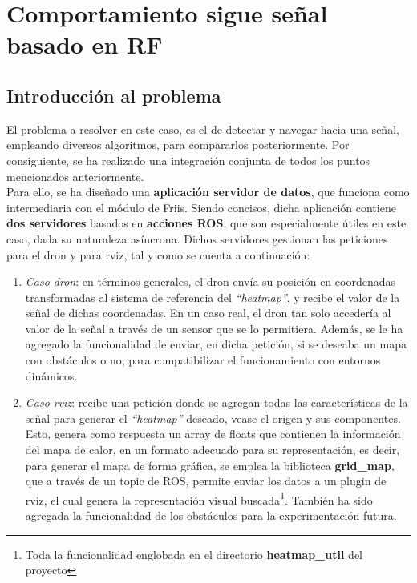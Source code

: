 
\newpage
\section{Comportamiento sigue señal basado en \ac{RF}}
\label{sec:signal_follow}

\subsection{Introducción al problema}
\label{subsec:intro_sf}

El problema a resolver en este caso, es el de detectar y navegar hacia una señal, empleando diversos algoritmos, para compararlos posteriormente. Por consiguiente, se ha realizado una integración conjunta de todos los puntos mencionados anteriormente.\\

Para ello, se ha diseñado una \textbf{aplicación servidor de datos}, que funciona como intermediaria con el módulo de Friis. Siendo concisos, dicha aplicación contiene \textbf{dos servidores} basados en \textbf{acciones \ac{ROS}}, que son especialmente útiles en este caso, dada su naturaleza asíncrona. Dichos servidores gestionan las peticiones para el dron y para rviz, tal y como se cuenta a continuación:

\begin{enumerate}
	\item \emph{Caso dron}: en términos generales, el dron envía su posición en coordenadas transformadas al sistema de referencia del \emph{``heatmap''}, y recibe el valor de la señal de dichas coordenadas. En un caso real, el dron tan solo accedería al valor de la señal a través de un sensor que se lo permitiera. Además, se le ha agregado la funcionalidad de enviar, en dicha petición, si se deseaba un mapa con obstáculos o no, para compatibilizar el funcionamiento con entornos dinámicos.

	\item \emph{Caso rviz}: recibe una petición donde se agregan todas las características de la señal para generar el \emph{``heatmap''} deseado, vease el origen y sus componentes. Esto, genera como respuesta un array de floats que contienen la información del mapa de calor, en un formato adecuado para su representación, es decir, para generar el mapa de forma gráfica, se emplea la biblioteca \textbf{grid\_map}, que a través de un topic de \ac{ROS}, permite enviar los datos a un plugin de rviz, el cual genera la representación visual buscada\footnote[2]{Toda la funcionalidad englobada en el directorio \textbf{heatmap\_util} del proyecto}. También ha sido agregada la funcionalidad de los obstáculos para la experimentación futura.
\end{enumerate}

